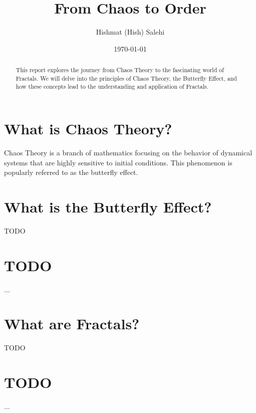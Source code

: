 \documentclass[12pt]{article}
\title{From Chaos to Order}
\author{Hishmat (Hish) Salehi}
\date{\today}
\begin{document}
\maketitle

\begin{abstract}
This report explores the journey from Chaos Theory to the fascinating world of Fractals. We will delve into the principles of Chaos Theory, the Butterfly Effect, and how these concepts lead to the understanding and application of Fractals.
\end{abstract}

\tableofcontents


\section{What is Chaos Theory?}
Chaos Theory is a branch of mathematics focusing on the behavior of dynamical systems that are highly sensitive to initial conditions. This phenomenon is popularly referred to as the butterfly effect.

\section{What is the Butterfly Effect?}
TODO

\section{TODO}

...


\section{What are Fractals?}
TODO

\section{TODO}

...
\end{document}
